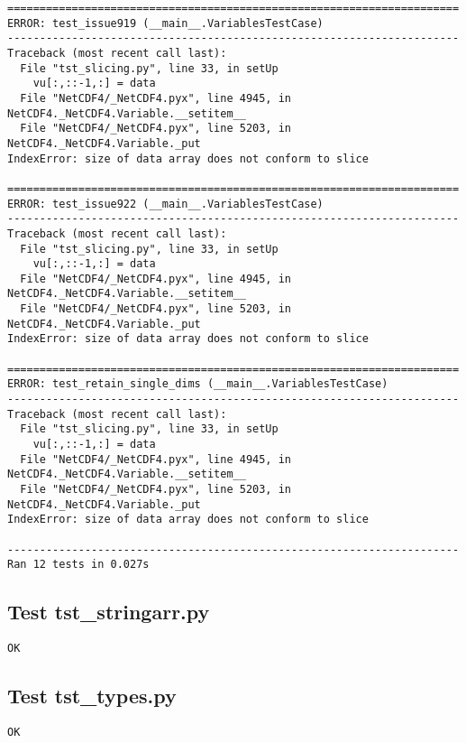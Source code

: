 \begin{verbatim}
======================================================================
ERROR: test_issue919 (__main__.VariablesTestCase)
----------------------------------------------------------------------
Traceback (most recent call last):
  File "tst_slicing.py", line 33, in setUp
    vu[:,::-1,:] = data
  File "NetCDF4/_NetCDF4.pyx", line 4945, in NetCDF4._NetCDF4.Variable.__setitem__
  File "NetCDF4/_NetCDF4.pyx", line 5203, in NetCDF4._NetCDF4.Variable._put
IndexError: size of data array does not conform to slice

======================================================================
ERROR: test_issue922 (__main__.VariablesTestCase)
----------------------------------------------------------------------
Traceback (most recent call last):
  File "tst_slicing.py", line 33, in setUp
    vu[:,::-1,:] = data
  File "NetCDF4/_NetCDF4.pyx", line 4945, in NetCDF4._NetCDF4.Variable.__setitem__
  File "NetCDF4/_NetCDF4.pyx", line 5203, in NetCDF4._NetCDF4.Variable._put
IndexError: size of data array does not conform to slice

======================================================================
ERROR: test_retain_single_dims (__main__.VariablesTestCase)
----------------------------------------------------------------------
Traceback (most recent call last):
  File "tst_slicing.py", line 33, in setUp
    vu[:,::-1,:] = data
  File "NetCDF4/_NetCDF4.pyx", line 4945, in NetCDF4._NetCDF4.Variable.__setitem__
  File "NetCDF4/_NetCDF4.pyx", line 5203, in NetCDF4._NetCDF4.Variable._put
IndexError: size of data array does not conform to slice

----------------------------------------------------------------------
Ran 12 tests in 0.027s
\end{verbatim}

\subsection{Test tst\_stringarr.py}

\begin{verbatim}
OK
\end{verbatim}

\subsection{Test tst\_types.py}

\begin{verbatim}
OK
\end{verbatim}

